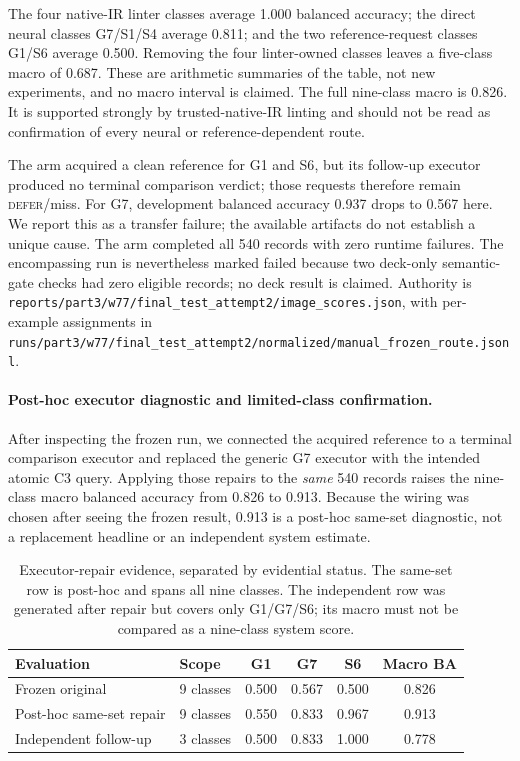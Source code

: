 \documentclass[11pt]{article}
\newcommand{\g}[1]{\textsf{#1}}
\begin{document}
The four native-IR linter classes average 1.000 balanced accuracy; the direct
neural classes \g{G7}/\g{S1}/\g{S4} average 0.811; and the two reference-request
classes \g{G1}/\g{S6} average 0.500. Removing the four linter-owned classes leaves
a five-class macro of 0.687. These are arithmetic summaries of the table, not
new experiments, and no macro interval is claimed. The full nine-class macro is
0.826. It is supported strongly by trusted-native-IR linting and should not be
read as confirmation of every neural or reference-dependent route.

The arm acquired a clean reference for \g{G1} and \g{S6}, but its follow-up
executor produced no terminal comparison verdict; those requests therefore
remain \textsc{defer}/miss. For \g{G7}, development balanced accuracy 0.937 drops
to 0.567 here. We report this as a transfer failure; the available artifacts do
not establish a unique cause. The arm completed all 540 records with zero
runtime failures. The encompassing run is nevertheless marked failed because
two deck-only semantic-gate checks had zero eligible records; no deck result is
claimed. Authority is
\texttt{reports/part3/w77/final\_test\_attempt2/image\_scores.json}, with
per-example assignments in
\texttt{runs/part3/w77/final\_test\_attempt2/normalized/manual\_frozen\_route.jsonl}.

\paragraph{Post-hoc executor diagnostic and limited-class confirmation.}
After inspecting the frozen run, we connected the acquired reference to a
terminal comparison executor and replaced the generic \g{G7} executor with the
intended atomic C3 query. Applying those repairs to the \emph{same} 540 records
raises the nine-class macro balanced accuracy from 0.826 to 0.913. Because the
wiring was chosen after seeing the frozen result, 0.913 is a post-hoc same-set
diagnostic, not a replacement headline or an independent system estimate.

\begin{table}[h]
\centering
\small
\setlength{\tabcolsep}{5pt}
\caption{Executor-repair evidence, separated by evidential status. The same-set
row is post-hoc and spans all nine classes. The independent row was generated
after repair but covers only \g{G1}/\g{G7}/\g{S6}; its macro must not be compared
as a nine-class system score.}
\label{tab:executor-repair}
\begin{tabular}{@{}llcccc@{}}
\toprule
Evaluation & Scope & \g{G1} & \g{G7} & \g{S6} & Macro BA \\
\midrule
Frozen original & 9 classes & 0.500 & 0.567 & 0.500 & 0.826 \\
Post-hoc same-set repair & 9 classes & 0.550 & 0.833 & 0.967 & 0.913 \\
Independent follow-up & 3 classes & 0.500 & 0.833 & 1.000 & 0.778 \\
\bottomrule
\end{tabular}
\end{table}
\end{document}
